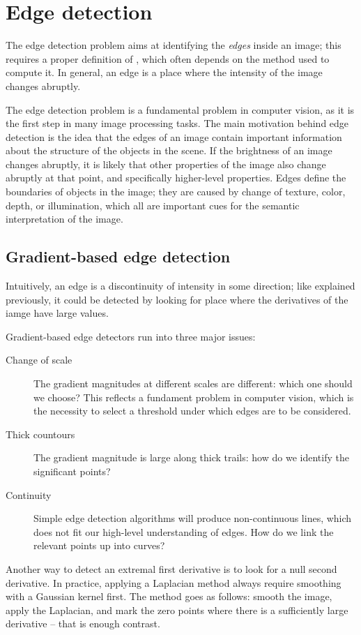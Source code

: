 \section{Edge detection}
The edge detection problem aims at identifying the \emph{edges} inside an image; this requires a proper definition of , which often depends on the method used to compute it. In general, an edge is a place where the intensity of the image changes abruptly. 

The edge detection problem is a fundamental problem in computer vision, as it is the first step in many image processing tasks. The main motivation behind edge detection is the idea that the edges of an image contain important information about the structure of the objects in the scene. If the brightness of an image changes abruptly, it is likely that other properties of the image also change abruptly at that point, and specifically higher-level properties. Edges define the boundaries of objects in the image; they are caused by change of texture, color, depth, or illumination, which all are important cues for the semantic interpretation of the image.

\subsection{Gradient-based edge detection}
Intuitively, an edge is a discontinuity of intensity in some direction; like explained previously, it could be detected by looking for place where the derivatives of the iamge have large values.

Gradient-based edge detectors run into three major issues:
\begin{description}
    \item[Change of scale] The gradient magnitudes at different scales are different: which one should we choose? This reflects a fundament problem in computer vision, which is the necessity to select a threshold under which edges are  to be considered.
    \item[Thick countours] The gradient magnitude is large along thick trails: how do we identify the significant points?
    \item[Continuity] Simple edge detection algorithms will produce non-continuous lines, which does not fit our high-level understanding of edges. How do we link the relevant points up into curves?
\end{description}

Another way to detect an extremal first derivative is to look for a null second derivative. In practice, applying a Laplacian method always require smoothing with a Gaussian kernel first. The method goes as follows: smooth the image, apply the Laplacian, and mark the zero points where there is a sufficiently large derivative -- that is enough contrast.

